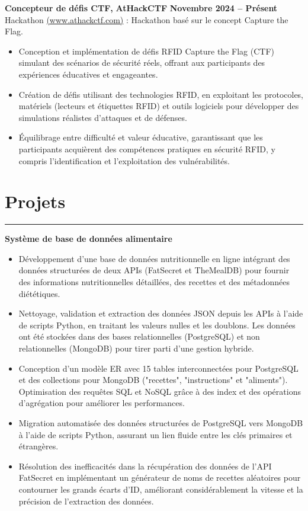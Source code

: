 \documentclass[10pt]{article}
\begin{document}
\textbf{Concepteur de défis CTF, } \hfill \textbf{AtHackCTF} \hfill \textbf{Novembre 2024 -- Présent} \\
{Hackathon {\href{https://www.athackctf.com}{(www.athackctf.com)} : Hackathon basé sur le concept Capture the Flag.}}
\vspace{-4mm}
\begin{itemize}[left=0.15in, itemsep=0pt]
    \item Conception et implémentation de défis RFID Capture the Flag (CTF) simulant des scénarios de sécurité réels, offrant aux participants des expériences éducatives et engageantes.
    \item Création de défis utilisant des technologies RFID, en exploitant les protocoles, matériels (lecteurs et étiquettes RFID) et outils logiciels pour développer des simulations réalistes d'attaques et de défenses.
    \item Équilibrage entre difficulté et valeur éducative, garantissant que les participants acquièrent des compétences pratiques en sécurité RFID, y compris l'identification et l'exploitation des vulnérabilités.
\end{itemize}

\section*{Projets}
\vspace{-2mm}
\hrule
\vspace{0mm}

\textbf{Système de base de données alimentaire}
\vspace{-4mm}
\begin{itemize}[left=0.15in, itemsep=0pt, label=--]
    \item Développement d'une base de données nutritionnelle en ligne intégrant des données structurées de deux APIs (FatSecret et TheMealDB) pour fournir des informations nutritionnelles détaillées, des recettes et des métadonnées diététiques.
    \item Nettoyage, validation et extraction des données JSON depuis les APIs à l'aide de scripts Python, en traitant les valeurs nulles et les doublons. Les données ont été stockées dans des bases relationnelles (PostgreSQL) et non relationnelles (MongoDB) pour tirer parti d'une gestion hybride.
    \item Conception d'un modèle ER avec 15 tables interconnectées pour PostgreSQL et des collections pour MongoDB ("recettes", "instructions" et "aliments"). Optimisation des requêtes SQL et NoSQL grâce à des index et des opérations d'agrégation pour améliorer les performances.
    \item Migration automatisée des données structurées de PostgreSQL vers MongoDB à l'aide de scripts Python, assurant un lien fluide entre les clés primaires et étrangères.
    \item Résolution des inefficacités dans la récupération des données de l'API FatSecret en implémentant un générateur de noms de recettes aléatoires pour contourner les grands écarts d'ID, améliorant considérablement la vitesse et la précision de l'extraction des données.
\end{itemize}
\end{document}
